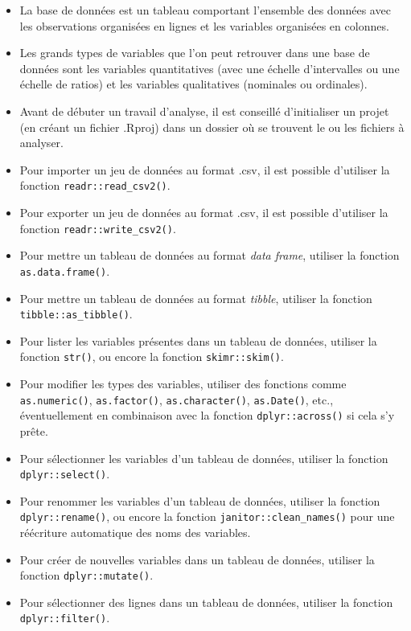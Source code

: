 \documentclass[
]{book}
\providecommand{\tightlist}{%
  \setlength{\itemsep}{0pt}\setlength{\parskip}{0pt}}
\begin{document}
\begin{itemize}
\tightlist
\item
  La base de données est un tableau comportant l'ensemble des données avec les observations organisées en lignes et les variables organisées en colonnes.
\item
  Les grands types de variables que l'on peut retrouver dans une base de données sont les variables quantitatives (avec une échelle d'intervalles ou une échelle de ratios) et les variables qualitatives (nominales ou ordinales).
\item
  Avant de débuter un travail d'analyse, il est conseillé d'initialiser un projet (en créant un fichier .Rproj) dans un dossier où se trouvent le ou les fichiers à analyser.
\item
  Pour importer un jeu de données au format .csv, il est possible d'utiliser la fonction \texttt{readr::read\_csv2()}.
\item
  Pour exporter un jeu de données au format .csv, il est possible d'utiliser la fonction \texttt{readr::write\_csv2()}.
\item
  Pour mettre un tableau de données au format \emph{data frame}, utiliser la fonction \texttt{as.data.frame()}.
\item
  Pour mettre un tableau de données au format \emph{tibble}, utiliser la fonction \texttt{tibble::as\_tibble()}.
\item
  Pour lister les variables présentes dans un tableau de données, utiliser la fonction \texttt{str()}, ou encore la fonction \texttt{skimr::skim()}.
\item
  Pour modifier les types des variables, utiliser des fonctions comme \texttt{as.numeric()}, \texttt{as.factor()}, \texttt{as.character()}, \texttt{as.Date()}, etc., éventuellement en combinaison avec la fonction \texttt{dplyr::across()} si cela s'y prête.
\item
  Pour sélectionner les variables d'un tableau de données, utiliser la fonction \texttt{dplyr::select()}.
\item
  Pour renommer les variables d'un tableau de données, utiliser la fonction \texttt{dplyr::rename()}, ou encore la fonction \texttt{janitor::clean\_names()} pour une réécriture automatique des noms des variables.
\item
  Pour créer de nouvelles variables dans un tableau de données, utiliser la fonction \texttt{dplyr::mutate()}.
\item
  Pour sélectionner des lignes dans un tableau de données, utiliser la fonction \texttt{dplyr::filter()}.

\end{itemize}
\end{document}
